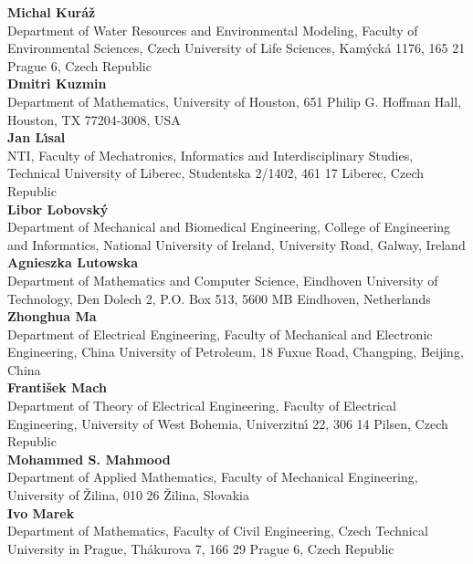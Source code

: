 \noindent
{\bf Michal Kur\'a\v{z}}\\
Department of Water Resources and Environmental Modeling,
Faculty of Environmental Sciences,
Czech University of Life Sciences,
Kam\'yck\'a 1176,
165 21 Prague 6,
Czech Republic\\

\noindent
{\bf Dmitri Kuzmin}\\
Department of Mathematics,
University of Houston,
651 Philip G. Hoffman Hall,
Houston,
TX 77204-3008,
USA\\

\noindent
{\bf Jan L\'{\i}sal}\\
NTI,
Faculty of Mechatronics, Informatics and Interdisciplinary Studies,
Technical University of Liberec,
Studentska 2/1402,
461 17 Liberec,
Czech Republic\\

\noindent
{\bf Libor Lobovsk\'y}\\
Department of Mechanical and Biomedical Engineering,
College of Engineering and Informatics,
National University of Ireland,
University Road,
Galway, Ireland\\

\noindent
{\bf Agnieszka Lutowska}\\
Department of Mathematics and Computer Science,
Eindhoven University of Technology,
Den Dolech 2,
P.O. Box 513,
5600 MB Eindhoven,
Netherlands\\

\noindent
{\bf Zhonghua Ma}\\
Department of Electrical Engineering,
Faculty of Mechanical and Electronic Engineering,
China University of Petroleum,
18 Fuxue Road,
Changping,
Beijing,
China\\

\noindent
{\bf Franti\v sek Mach}\\
Department of Theory of Electrical Engineering,
Faculty of Electrical Engineering,
University of West Bohemia,
Univerzitn\'{\i} 22,
306 14 Pilsen,
Czech Republic\\

\noindent
{\bf Mohammed S. Mahmood}\\
Department of Applied Mathematics,
Faculty of Mechanical Engineering,
University of \v Zilina,
010 26 \v Zilina,
Slovakia\\

\noindent
{\bf Ivo Marek}\\
Department of Mathematics,
Faculty of Civil Engineering,
Czech Technical University in Prague,
Th\'akurova 7,
166 29 Prague 6,
Czech Republic\\

